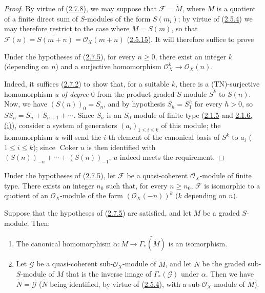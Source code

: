 \begin{proof}
By virtue of (\hyperref[II.2.7.8]{2.7.8}), we may suppose that
$\mathcal{F}=\widetilde{M}$, where $M$ is a quotient of a finite direct sum of
$S$-modules of the form $S(m_i)$; by virtue of
(\hyperref[II.2.5.4]{2.5.4}) we may therefore restrict to the case where
$M=S(m)$, so that $\mathcal{F}(n)=\widetilde{S(m+n)}
=\mathcal{O}_X(m+n)$ (\hyperref[II.2.5.15]{2.5.15}). It will therefore
suffice to prove

\begin{lemma}[2.7.9.1]
\label{II.2.7.9.1}
Under the hypotheses of (\hyperref[II.2.7.5]{2.7.5}), for every $n\geq0$,
there exist an integer $k$ (depending on $n$) and a surjective homomorphism
$\mathcal{O}_X^k\to\mathcal{O}_X(n)$.
\end{lemma}

Indeed, it suffices (\hyperref[II.2.7.2]{2.7.2}) to show that, for a
suitable $k$, there is a (TN)-surjective homomorphism $u$ \emph{of degree $0$}
from the product graded $S$-module $S^k$ to $S(n)$. Now, we have
$(S(n))_0=S_n$, and by hypothesis $S_h=S_1^h$ for every $h>0$, so
$SS_n=S_n+S_{n+1}+\cdots$. Since $S_n$ is an $S_0$-module of finite type
(\hyperref[II.2.1.5]{2.1.5} and
\hyperref[II.2.1.6]{2.1.6, (i)}), consider a system of generators
$(a_i)_{1\leq i\leq k}$ of this module; the homomorphism $u$ will send the
$i$-th element of the canonical basis of $S^k$ to $a_i$ ($1\leq i\leq k$);
since $\operatorname{Coker}u$ is then identified with
$(S(n))_{-n}+\cdots+(S(n))_{-1}$, $u$ indeed meets the requirement.
\end{proof}

\begin{corollary}[2.7.10]
\label{II.2.7.10}
Under the hypotheses of (\hyperref[II.2.7.5]{2.7.5}), let $\mathcal{F}$ be
a quasi-coherent $\mathcal{O}_X$-module of finite type. There exists an
integer $n_0$ such that, for every $n\geq n_0$, $\mathcal{F}$ is isomorphic to
a quotient of an $\mathcal{O}_X$-module of the form $(\mathcal{O}_X(-n))^k$
($k$ depending on $n$).
\end{corollary}

\begin{proposition}[2.7.11]
\label{II.2.7.11}
Suppose that the hypotheses of
(\hyperref[II.2.7.5]{2.7.5}) are satisfied, and let $M$ be a graded
$S$-module. Then:
\begin{enumerate}
  \item[\rm(i)] The canonical homomorphism
    $\widetilde{\alpha}:\widetilde{M}\to
    \widetilde{\Gamma_*(\widetilde{M})}$ is an isomorphism.
  \item[\rm(ii)] Let $\mathcal{G}$ be a quasi-coherent
    sub-$\mathcal{O}_X$-module of $\widetilde{M}$, and let $N$ be the graded
    sub-$S$-module of $M$ that is the inverse image of $\Gamma_*(\mathcal{G})$
    under $\alpha$. Then we have $\widetilde{N}=\mathcal{G}$ ($\widetilde{N}$
    being identified, by virtue of (\hyperref[II.2.5.4]{2.5.4}), with a
    sub-$\mathcal{O}_X$-module of $\widetilde{M}$).
\end{enumerate}
\end{proposition}

